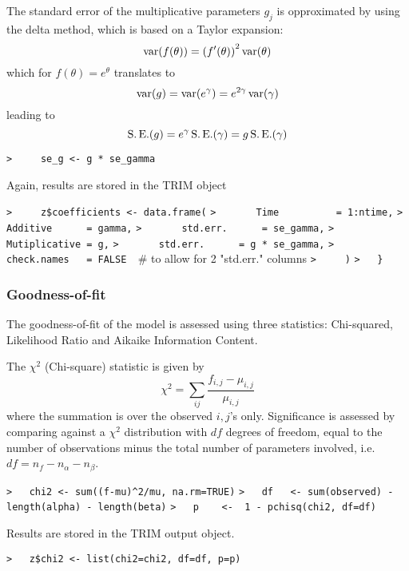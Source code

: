 \documentclass[a4paper]{article}
\begin{document}
The standard error of the multiplicative parameters $g_j$ is opproximated by
using the delta method, which is based on a Taylor expansion:
\begin{equation}
  \operatorname{var}(f(\theta)) = \left(f'(\theta)\right)^2 \operatorname{var}(\theta)
\end{equation}
which for $f(\theta)=e^\theta$ translates to
$$ \operatorname{var}(g) = \operatorname{var}(e^{\gamma}) = e^{2\gamma} \operatorname{var}(\gamma) $$
leading to
$$ \operatorname{S.E.}(g) = e^{\gamma} \operatorname{S.E.}(\gamma) = g \operatorname{S.E.}(\gamma) $$\par
\verb~>     se_g <- g * se_gamma~\par

Again, results are stored in the TRIM object\par
\verb~>     z$coefficients <- data.frame(~\newline
\verb~>       Time          = 1:ntime,~\newline
\verb~>       Additive      = gamma,~\newline
\verb~>       std.err.      = se_gamma,~\newline
\verb~>       Mutiplicative = g,~\newline
\verb~>       std.err.      = g * se_gamma,~\newline
\verb~>       check.names   = FALSE  ~{\sffamily\# to allow for 2 "std.err." columns}\newline
\verb~>     )~\newline
\verb~>   }~\par



\subsubsection{Goodness-of-fit}\par

The goodness-of-fit of the model is assessed using three statistics:
Chi-squared, Likelihood Ratio and Aikaike Information Content.\par

The $\chi^2$ (Chi-square) statistic is given by
\begin{equation}
  \chi^2 = \sum_{ij}\frac{f_{i,j}-\mu_{i,j}}{\mu_{i,j}}
\end{equation}
where the summation is over the observed $i,j$'s only.
Significance is assessed by comparing against a $\chi^2$ distribution with
$df$ degrees of freedom, equal to the number of observations
minus the total number of parameters involved, i.e.\
$df = n_f - n_\alpha - n_\beta$.\par
\verb~>   chi2 <- sum((f-mu)^2/mu, na.rm=TRUE)~\newline
\verb~>   df   <- sum(observed) - length(alpha) - length(beta)~\newline
\verb~>   p    <-  1 - pchisq(chi2, df=df)~\par
Results are stored in the TRIM output object.\par
\verb~>   z$chi2 <- list(chi2=chi2, df=df, p=p)~\par
\end{document}
